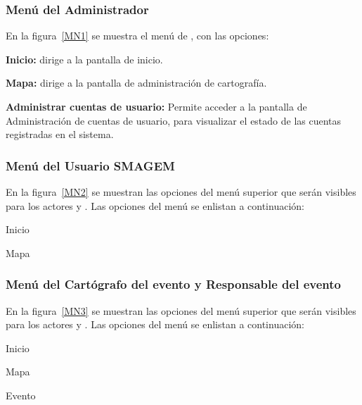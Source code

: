 \subsubsection{Menú del Administrador}
En la figura~\ref{MN1} se muestra el menú de , con las opciones:

    \begin{Citemize}
	    \item {\bf Inicio:} dirige a la pantalla de inicio.
	    \item {\bf Mapa:} dirige a la pantalla de administración de cartografía.
	    \item {\bf Administrar cuentas de usuario:} Permite acceder a la pantalla de Administración de cuentas de usuario, para visualizar el estado de las cuentas registradas en el sistema.
    \end{Citemize}


\subsubsection{Menú del Usuario SMAGEM}

    En la figura~\ref{MN2} se muestran las opciones del menú superior que serán visibles para los actores  y . Las opciones del menú se enlistan a continuación:

    \begin{Citemize}
	    \item Inicio
	    \item Mapa
    \end{Citemize}

    
    
\subsubsection{Menú del Cartógrafo del evento y Responsable del evento}

    En la figura~\ref{MN3} se muestran las opciones del menú superior que serán visibles para los actores  y . Las opciones del menú se enlistan a continuación:

    \begin{Citemize}
      \item Inicio
      \item Mapa
      \item Evento
    \end{Citemize}

